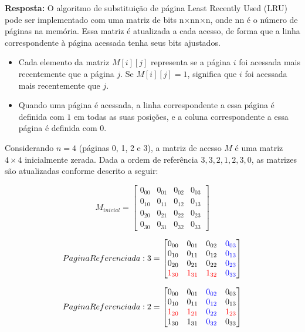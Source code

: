 \documentclass{article}
\begin{document}
\textbf{Resposta: }O algoritmo de substituição de página Least Recently Used (LRU) pode ser implementado com uma matriz de bits n×nn×n, onde nn é o número de páginas na memória. Essa matriz é atualizada a cada acesso, de forma que a linha correspondente à página acessada tenha seus bits ajustados.

\begin{itemize}
    \item Cada elemento da matriz $M[i][j]$ representa se a página $i$ foi acessada mais recentemente que a página $j$. Se $M[i][j]=1$, significa que $i$ foi acessada mais recentemente que $j$.
    \item Quando uma página é acessada, a linha correspondente a essa página é definida com $1$ em todas as suas posições, e a coluna correspondente a essa página é definida com $0$.
\end{itemize}

Considerando $n=4$ (páginas 0, 1, 2 e 3), a matriz de acesso $M$ é uma matriz $4 \times 4$ inicialmente zerada. Dada a ordem de referência $3, 3, 2, 1, 2, 3, 0$, as matrizes são atualizadas conforme descrito a seguir:


\[M_{inicial} =
\begin{bmatrix}
  0_{00} & 0_{01} & 0_{02} & 0_{03}\\
  0_{10} & 0_{11} & 0_{12}    & 0_{13}\\
  0_{20} & 0_{21} & 0_{22}    & 0_{23}\\
  0_{30} & 0_{31} & 0_{32}    & 0_{33}
\end{bmatrix}
\]

\[PaginaReferenciada: 3 =
\begin{bmatrix}
  0_{00} & 0_{01} & 0_{02} & \textcolor{blue}{0_{03}}\\
  0_{10} & 0_{11} & 0_{12}    & \textcolor{blue}{0_{13}}\\
  0_{20} & 0_{21} & 0_{22}    & \textcolor{blue}{0_{23}}\\
  \textcolor{red}{1_{30}} & \textcolor{red}{1_{31}} & \textcolor{red}{1_{32}}    & \textcolor{blue}{0_{33}}
\end{bmatrix}
\]

\[
PaginaReferenciada: 2 =
\begin{bmatrix}
  0_{00} & 0_{01} & \textcolor{blue}{0_{02}} & 0_{03} \\
  0_{10} & 0_{11} & \textcolor{blue}{0_{12}} & 0_{13} \\
  \textcolor{red}{1_{20}} & \textcolor{red}{1_{21}} & \textcolor{blue}{0_{22}} & \textcolor{red}{1_{23}} \\
  1_{30} & 1_{31} & \textcolor{blue}{0_{32}} & 0_{33}
\end{bmatrix}
\]
\end{document}
